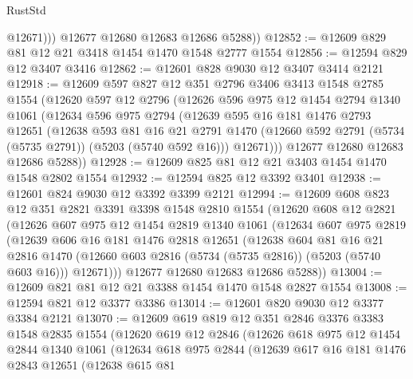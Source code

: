 \begin{lexlean}{RustStd}
\begin{coremodule}
              @12671)))
        @12677
        @12680
        @12683
        @12686
        @5288))
@12852 := @12609 @829 @81 @12 @21 @3418 @1454 @1470 @1548 @2777 @1554
@12856 := @12594 @829 @12 @3407 @3416
@12862 := @12601 @828 @9030 @12 @3407 @3414 @2121
@12918 := @12609
    @597
    @827
    @12
    @351
    @2796
    @3406
    @3413
    @1548
    @2785
    @1554
    (@12620
      @597
      @12
      @2796
      (@12626
        @596
        @975
        @12
        @1454
        @2794
        @1340
        @1061
        (@12634
          @596
          @975
          @2794
          (@12639
            @595
            @16
            @181
            @1476
            @2793
            @12651
            (@12638
              @593
              @81
              @16
              @21
              @2791
              @1470
              (@12660 @592 @2791 (@5734 (@5735 @2791)) (@5203 (@5740 @592 @16)))
              @12671)))
        @12677
        @12680
        @12683
        @12686
        @5288))
@12928 := @12609 @825 @81 @12 @21 @3403 @1454 @1470 @1548 @2802 @1554
@12932 := @12594 @825 @12 @3392 @3401
@12938 := @12601 @824 @9030 @12 @3392 @3399 @2121
@12994 := @12609
    @608
    @823
    @12
    @351
    @2821
    @3391
    @3398
    @1548
    @2810
    @1554
    (@12620
      @608
      @12
      @2821
      (@12626
        @607
        @975
        @12
        @1454
        @2819
        @1340
        @1061
        (@12634
          @607
          @975
          @2819
          (@12639
            @606
            @16
            @181
            @1476
            @2818
            @12651
            (@12638
              @604
              @81
              @16
              @21
              @2816
              @1470
              (@12660 @603 @2816 (@5734 (@5735 @2816)) (@5203 (@5740 @603 @16)))
              @12671)))
        @12677
        @12680
        @12683
        @12686
        @5288))
@13004 := @12609 @821 @81 @12 @21 @3388 @1454 @1470 @1548 @2827 @1554
@13008 := @12594 @821 @12 @3377 @3386
@13014 := @12601 @820 @9030 @12 @3377 @3384 @2121
@13070 := @12609
    @619
    @819
    @12
    @351
    @2846
    @3376
    @3383
    @1548
    @2835
    @1554
    (@12620
      @619
      @12
      @2846
      (@12626
        @618
        @975
        @12
        @1454
        @2844
        @1340
        @1061
        (@12634
          @618
          @975
          @2844
          (@12639
            @617
            @16
            @181
            @1476
            @2843
            @12651
            (@12638
              @615
              @81

\end{coremodule}
\end{lexlean}
